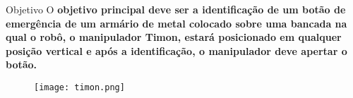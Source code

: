 \begin{frame}[t]{Objetivo} 
    \transdissolve[duration=0.5]
    O \bf{objetivo principal} deve ser a {identificação} de um {botão de emergência} de um armário de metal colocado sobre uma bancada na qual o robô, o manipulador Timon, estará posicionado em qualquer posição vertical  e após a identificação, o manipulador deve apertar o botão.

    \begin{center}
        \begin{figure}
            \texttt{[image: timon.png]}
            
        \end{figure}
        
    \end{center}

    
\end{frame}
%   
%    
%   
%    
